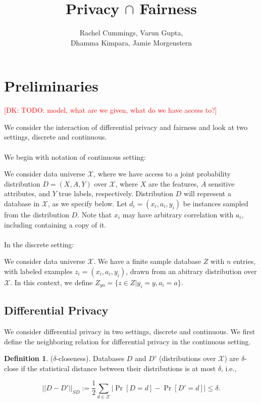 \documentclass[format = sigconf]{acmart}
\newcommand{\dk}[1]{\textcolor{red}{[DK: #1]}}
\newcommand{\X}{\mathcal{X}}
\newcommand{\1}{\mathbbm{1}}
\theoremstyle{definition}
\newtheorem{defn}{Definition}[section]
\begin{document}

\title{Privacy $\cap$ Fairness}
{\author{Rachel Cummings, Varun Gupta, \\Dhamma Kimpara, Jamie Morgenstern}}
\maketitle
\section{Preliminaries}
\dk{TODO: model, what are we given, what do we have access to?}

We consider the interaction of differential privacy and fairness and look at two settings, discrete and continuous. \\ \\
We begin with notation of continuous setting:

We consider data universe $\X$, where we have access to a joint probability distribution $D = (X, A, Y)$ over $\X$, where $X$ are the features, $A$ sensitive attributes, and $Y$ true labels, respectively. Distribution $D$ will represent a database in $\X$, as we specify below. Let $d_i = (x_i, a_i, y_i)$ be instances sampled from the distribution $D$. Note that $x_i$ may have arbitrary correlation with $a_i$, including containing a copy of it.
 \\ \\
In the discrete setting:

We consider data universe $\X$. We have a finite sample database $Z$ with $n$ entries, with labeled examples $z_i = (x_i, a_i, y_i)$, drawn from an abitrary distribution over $\X$. In this context, we define $Z_{ya} = \{z \in Z | y_i =y, a_i = a\}$.
\subsection{Differential Privacy}
We consider differential privacy in two settings, discrete and continuous.
We first define the neighboring relation for differential privacy in the continuous setting.

\begin{defn}
	($\delta$-closeness). Databases  $D$ and $D'$ (distributions over $\mathcal{X}$) are $\delta$-close if the statistical distance between their distributions is at most $\delta$, i.e.,

	$$ ||D-D'||_{\textit{SD}} :=\frac{1}{2}\sum_{d\in \mathcal{X}} |\Pr[D=d] - \Pr[D'=d]| \leq \delta.$$
\end{defn}
\end{document}
